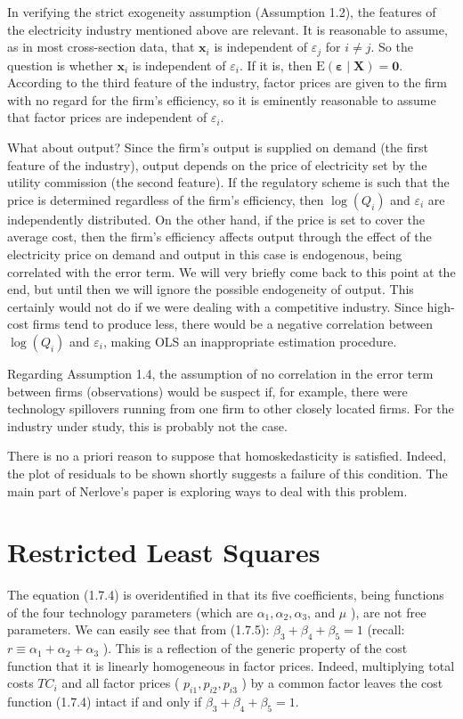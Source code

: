 \documentclass[10pt]{article}
\begin{document}
In verifying the strict exogeneity assumption (Assumption 1.2), the features of the electricity industry mentioned above are relevant. It is reasonable to assume, as in most cross-section data, that $\mathbf{x}_{i}$ is independent of $\varepsilon_{j}$ for $i \neq j$. So the question is whether $\mathbf{x}_{i}$ is independent of $\varepsilon_{i}$. If it is, then $\mathrm{E}(\boldsymbol{\varepsilon} \mid \mathbf{X})=\mathbf{0}$. According to the third feature of the industry, factor prices are given to the firm with no regard for the firm's efficiency, so it is eminently reasonable to assume that factor prices are independent of $\varepsilon_{i}$.

What about output? Since the firm's output is supplied on demand (the first feature of the industry), output depends on the price of electricity set by the utility commission (the second feature). If the regulatory scheme is such that the price is determined regardless of the firm's efficiency, then $\log \left(Q_{i}\right)$ and $\varepsilon_{i}$ are independently distributed. On the other hand, if the price is set to cover the average cost, then the firm's efficiency affects output through the effect of the electricity price on demand and output in this case is endogenous, being correlated with the error term. We will very briefly come back to this point at the end, but until then we will ignore the possible endogeneity of output. This certainly would not do if we were dealing with a competitive industry. Since high-cost firms tend to produce less, there would be a negative correlation between $\log \left(Q_{i}\right)$ and $\varepsilon_{i}$, making OLS an inappropriate estimation procedure.

Regarding Assumption 1.4, the assumption of no correlation in the error term between firms (observations) would be suspect if, for example, there were technology spillovers running from one firm to other closely located firms. For the industry under study, this is probably not the case.

There is no a priori reason to suppose that homoskedasticity is satisfied. Indeed, the plot of residuals to be shown shortly suggests a failure of this condition. The main part of Nerlove's paper is exploring ways to deal with this problem.

\section*{Restricted Least Squares}
The equation (1.7.4) is overidentified in that its five coefficients, being functions of the four technology parameters (which are $\alpha_{1}, \alpha_{2}, \alpha_{3}$, and $\mu$ ), are not free parameters. We can easily see that from (1.7.5): $\beta_{3}+\beta_{4}+\beta_{5}=1$ (recall: $r \equiv \alpha_{1}+\alpha_{2}+\alpha_{3}$ ). This is a reflection of the generic property of the cost function that it is linearly homogeneous in factor prices. Indeed, multiplying total costs $T C_{i}$ and all factor prices ( $p_{i 1}, p_{i 2}, p_{i 3}$ ) by a common factor leaves the cost function (1.7.4) intact if and only if $\beta_{3}+\beta_{4}+\beta_{5}=1$.
\end{document}
